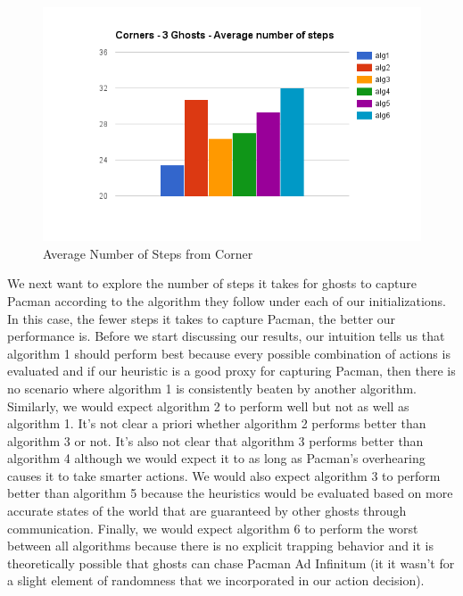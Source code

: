 \documentclass[11pt]{article}
\begin{document}
\begin{multicols}{2}
\begin{figure}[H]
	\includegraphics[scale=0.45]{cornersteps.png}
	\caption{Average Number of Steps from Corner}
	\label{fig:averagenumstepscorner}
\end{figure}

\noindent We next want to explore the number of steps it takes for ghosts to capture Pacman according to the algorithm they follow under each of our initializations. In this case, the fewer steps it takes to capture Pacman, the better our performance is. Before we start discussing our results, our intuition tells us that algorithm 1 should perform best because every possible combination of actions is evaluated and if our heuristic is a good proxy for capturing Pacman, then there is no scenario where algorithm 1 is consistently beaten by another algorithm. Similarly, we would expect algorithm 2 to perform well but not as well as algorithm 1. It's not clear a priori whether algorithm 2 performs better than algorithm 3 or not. It's also not clear that algorithm 3 performs better than algorithm 4 although we would expect it to as long as Pacman's overhearing causes it to take smarter actions. We would also expect algorithm 3 to perform better than algorithm 5 because the heuristics would be evaluated based on more accurate states of the world that are guaranteed by other ghosts through communication. Finally, we would expect algorithm 6 to perform the worst between all algorithms because there is no explicit trapping behavior and it is theoretically possible that ghosts can chase Pacman Ad Infinitum (it it wasn't for a slight element of randomness that we incorporated in our action decision). 


\end{multicols}
\end{document}
